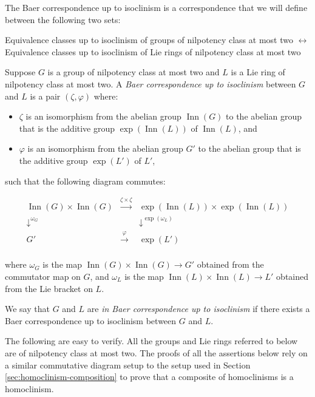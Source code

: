\documentclass{ucetd}
\begin{document}
The Baer correspondence up to isoclinism is a correspondence that we
will define between the following two sets:

Equivalence classes up to isoclinism of groups of nilpotency class at
most two $\leftrightarrow$ Equivalence classes up to isoclinism of Lie rings of nilpotency class at most two

Suppose $G$ is a group of nilpotency class at most two and $L$ is a
Lie ring of nilpotency class at most two. A {\em Baer correspondence
  up to isoclinism} between $G$ and $L$ is a pair $(\zeta,\varphi)$
where:

\begin{itemize}
\item $\zeta$ is an isomorphism from the abelian group
  $\operatorname{Inn}(G)$ to the abelian group that is the additive
  group $\exp(\operatorname{Inn}(L))$ of $\operatorname{Inn}(L)$, and
\item $\varphi$ is an isomorphism from the abelian group $G'$ to the
  abelian group that is the additive group $\exp(L')$ of $L'$, 
\end{itemize}

such that the following diagram commutes:

$$\begin{array}{ccc}
  \operatorname{Inn}(G) \times \operatorname{Inn}(G) & \stackrel{\zeta \times \zeta}{\to} & \exp(\operatorname{Inn}(L)) \times \exp(\operatorname{Inn}(L)) \\
  \downarrow^{\omega_{G}}  & & \downarrow^{\exp(\omega_{L})}\\
  G' & \stackrel{\varphi}{\to} & \exp(L')\\
\end{array}$$

where $\omega_G$ is the map $\operatorname{Inn}(G) \times
\operatorname{Inn}(G) \to G'$ obtained from the commutator map on $G$,
and $\omega_L$ is the map $\operatorname{Inn}(L) \times
\operatorname{Inn}(L) \to L'$ obtained from the Lie bracket on $L$.

We say that $G$ and $L$ are {\em in Baer correspondence up to
  isoclinism} if there exists a Baer correspondence up to isoclinism
between $G$ and $L$.

The following are easy to verify. All the groups and Lie rings
referred to below are of nilpotency class at most two. The proofs of
all the assertions below rely on a similar commutative diagram setup to
the setup used in Section \ref{sec:homoclinism-composition} to prove
that a composite of homoclinisms is a homoclinism.
\end{document}
